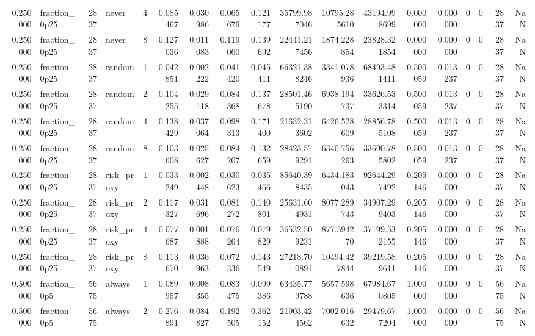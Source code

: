 \begin{tabular}{rlrlrrrrrrrrrrrrrr}
0.250000 & fraction\_0p25 & 2837 & never & 4 & 0.085467 & 0.030986 & 0.065679 & 0.121177 & 35799.987046 & 10795.285610 & 43194.998699 & 0.000000 & 0.000000 & 0 & 0 & 2837 & NaN \\
0.250000 & fraction\_0p25 & 2837 & never & 8 & 0.127036 & 0.011083 & 0.119060 & 0.139692 & 22441.217456 & 1874.228854 & 23828.321854 & 0.000000 & 0.000000 & 0 & 0 & 2837 & NaN \\
0.250000 & fraction\_0p25 & 2837 & random & 1 & 0.042851 & 0.002222 & 0.041420 & 0.045411 & 66321.388246 & 3341.078936 & 68493.481411 & 0.500059 & 0.013237 & 0 & 0 & 2837 & NaN \\
0.250000 & fraction\_0p25 & 2837 & random & 2 & 0.104255 & 0.029118 & 0.084368 & 0.137678 & 28501.465190 & 6938.194737 & 33626.533314 & 0.500059 & 0.013237 & 0 & 0 & 2837 & NaN \\
0.250000 & fraction\_0p25 & 2837 & random & 4 & 0.138429 & 0.037064 & 0.098313 & 0.171400 & 21632.313602 & 6426.528609 & 28856.785108 & 0.500059 & 0.013237 & 0 & 0 & 2837 & NaN \\
0.250000 & fraction\_0p25 & 2837 & random & 8 & 0.103608 & 0.025627 & 0.084207 & 0.132659 & 28423.579291 & 6340.756263 & 33690.785802 & 0.500059 & 0.013237 & 0 & 0 & 2837 & NaN \\
0.250000 & fraction\_0p25 & 2837 & risk\_proxy & 1 & 0.033249 & 0.002448 & 0.030623 & 0.035466 & 85640.398435 & 6434.183043 & 92644.297492 & 0.205146 & 0.000000 & 0 & 0 & 2837 & NaN \\
0.250000 & fraction\_0p25 & 2837 & risk\_proxy & 2 & 0.117327 & 0.031696 & 0.081272 & 0.140801 & 25631.604931 & 8077.289743 & 34907.299403 & 0.205146 & 0.000000 & 0 & 0 & 2837 & NaN \\
0.250000 & fraction\_0p25 & 2837 & risk\_proxy & 4 & 0.077687 & 0.001888 & 0.076264 & 0.079829 & 36532.509231 & 877.594270 & 37199.532155 & 0.205146 & 0.000000 & 0 & 0 & 2837 & NaN \\
0.250000 & fraction\_0p25 & 2837 & risk\_proxy & 8 & 0.113670 & 0.036963 & 0.072336 & 0.143549 & 27218.700891 & 10494.427844 & 39219.589611 & 0.205146 & 0.000000 & 0 & 0 & 2837 & NaN \\
0.500000 & fraction\_0p5 & 5675 & always & 1 & 0.089957 & 0.008355 & 0.083475 & 0.099386 & 63435.779788 & 5657.598636 & 67984.670805 & 1.000000 & 0.000000 & 0 & 0 & 5675 & NaN \\
0.500000 & fraction\_0p5 & 5675 & always & 2 & 0.276891 & 0.084827 & 0.192505 & 0.362152 & 21903.424562 & 7002.016632 & 29479.677204 & 1.000000 & 0.000000 & 0 & 0 & 5675 & NaN \\

\end{tabular}
